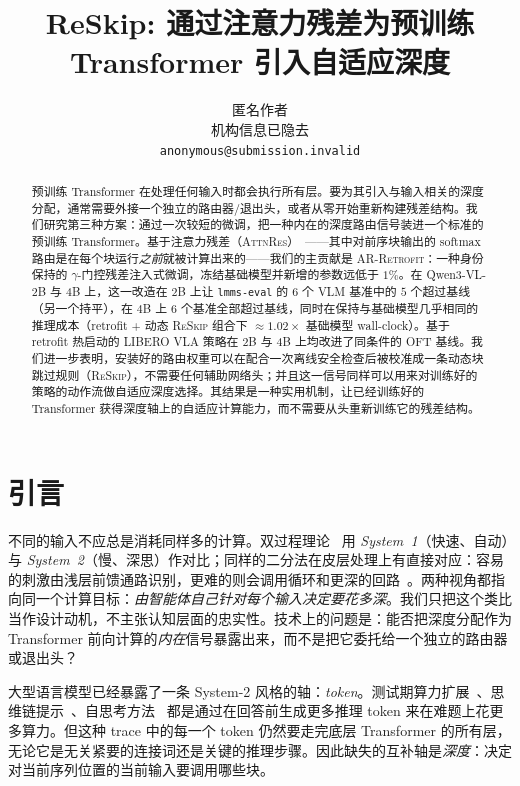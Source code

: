 \documentclass{article}
\title{ReSkip: 通过注意力残差为预训练 Transformer 引入自适应深度}
\author{
  匿名作者 \\
  机构信息已隐去 \\
  \texttt{anonymous@submission.invalid}
}
\newcommand{\attnres}{\textsc{AttnRes}}
\newcommand{\reskip}{\textsc{ReSkip}}
\newcommand{\retrofit}{\textsc{AR-Retrofit}}
\begin{document}
\maketitle

\begin{abstract}
预训练 Transformer 在处理任何输入时都会执行所有层。要为其引入与输入相关的深度分配，通常需要外接一个独立的路由器/退出头，或者从零开始重新构建残差结构。我们研究第三种方案：通过一次较短的微调，把一种内在的深度路由信号装进一个标准的预训练 Transformer。基于注意力残差（\attnres{}）~\citep{chen2026attnres}——其中对前序块输出的 softmax 路由是在每个块运行\emph{之前}就被计算出来的——我们的主贡献是 \retrofit{}：一种身份保持的 $\gamma$-门控残差注入式微调，冻结基础模型并新增的参数远低于 $1\%$。在 Qwen3-VL-2B 与 4B 上，这一改造在 $2$B 上让 \texttt{lmms-eval} 的 $6$ 个 VLM 基准中的 $5$ 个超过基线（另一个持平），在 $4$B 上 $6$ 个基准全部超过基线，同时在保持与基础模型几乎相同的推理成本（retrofit + 动态 \reskip{} 组合下 $\approx 1.02\times$ 基础模型 wall-clock）。基于 retrofit 热启动的 LIBERO VLA 策略在 2B 与 4B 上均改进了同条件的 OFT 基线。我们进一步表明，安装好的路由权重可以在配合一次离线安全检查后被校准成一条动态块跳过规则（\reskip{}），不需要任何辅助网络头；并且这一信号同样可以用来对训练好的策略的动作流做自适应深度选择。其结果是一种实用机制，让已经训练好的 Transformer 获得深度轴上的自适应计算能力，而不需要从头重新训练它的残差结构。
\end{abstract}

\section{引言}
\label{sec:intro}

不同的输入不应总是消耗同样多的计算。双过程理论~\citep{kahneman2011thinking} 用 \emph{System~1}（快速、自动）与 \emph{System~2}（慢、深思）作对比；同样的二分法在皮层处理上有直接对应：容易的刺激由浅层前馈通路识别，更难的则会调用循环和更深的回路~\citep{lamme2000distinct, kar2019recurrent, kietzmann2019recurrence, spoerer2020recurrent}。两种视角都指向同一个计算目标：\emph{由智能体自己针对每个输入决定要花多深}。我们只把这个类比当作设计动机，不主张认知层面的忠实性。技术上的问题是：能否把深度分配作为 Transformer 前向计算的\emph{内在}信号暴露出来，而不是把它委托给一个独立的路由器或退出头？

大型语言模型已经暴露了一条 System-2 风格的轴：\emph{token}。测试期算力扩展~\citep{openai2024o1, deepseek2025r1, snell2024scaling}、思维链提示~\citep{wei2022chain}、自思考方法~\citep{zelikman2024quietstar} 都是通过在回答前生成更多推理 token 来在难题上花更多算力。但这种 trace 中的每一个 token 仍然要走完底层 Transformer 的所有层，无论它是无关紧要的连接词还是关键的推理步骤。因此缺失的互补轴是\emph{深度}：决定对当前序列位置的当前输入要调用哪些块。
\end{document}
